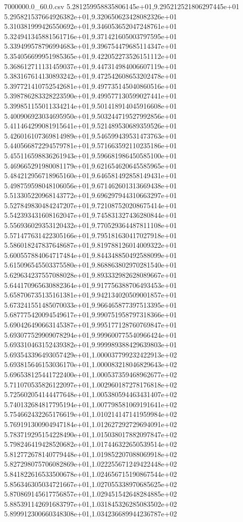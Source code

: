 \begin{filecontents*}{7000000.0_60.0.csv}
5.281259958835806145e+01,9.295212521806297445e+01
5.295821537664926382e+01,9.320650623428082326e+01
5.310381999426550692e+01,9.346053652047248761e+01
5.324941345881561716e+01,9.371421605003797595e+01
5.339499578796994683e+01,9.396754479685114347e+01
5.354056699951985365e+01,9.422052273526151112e+01
5.368612711131459037e+01,9.447314984006607119e+01
5.383167614130893242e+01,9.472542608653202478e+01
5.397721410752542681e+01,9.497735145040860516e+01
5.398786283328223590e+01,9.499577130599027441e+01
5.399851155011334214e+01,9.501418914045916608e+01
5.400906923034695950e+01,9.503244719527992856e+01
5.411464299081915641e+01,9.521489530689359526e+01
5.426016107369814989e+01,9.546599439531473763e+01
5.440566872294579781e+01,9.571663592110235186e+01
5.455116598836261943e+01,9.596681986450585100e+01
5.469665291980081179e+01,9.621654620645585965e+01
5.484212956718965160e+01,9.646581492858149431e+01
5.498759598048106056e+01,9.671462601313669438e+01
5.513305220968143772e+01,9.696297944310663297e+01
5.527849830484247207e+01,9.721087520208675414e+01
5.542393431608162047e+01,9.745831327436280844e+01
5.556936029353120432e+01,9.770529364487811108e+01
5.571477631422305166e+01,9.795181630417027918e+01
5.586018247837648687e+01,9.819788126014009322e+01
5.600557884064717484e+01,9.844348850492588099e+01
5.615096545503375580e+01,9.868863802970281540e+01
5.629634237557088028e+01,9.893332982628089667e+01
5.644170965630882364e+01,9.917756388706493453e+01
5.658706735135161381e+01,9.942134020509001857e+01
5.673241551485070033e+01,9.966465877397513395e+01
5.687775420094549617e+01,9.990751958797318366e+01
5.690426490663145387e+01,9.995177128760769847e+01
5.693077529909078294e+01,9.999600775540966424e+01
5.693310463152439382e+01,9.999989388429639803e+01
5.693543396493057429e+01,1.000037799232422913e+02
5.693815646153036170e+01,1.000083218046829643e+02
5.696538125441722400e+01,1.000537359468962677e+02
5.711070535826122097e+01,1.002960187278176818e+02
5.725602054144477648e+01,1.005380594463431407e+02
5.740132684817795194e+01,1.007798581069191641e+02
5.754662432265176619e+01,1.010214147141959984e+02
5.769191300904947184e+01,1.012627292729694091e+02
5.783719295154228490e+01,1.015038017882097847e+02
5.798246419428520682e+01,1.017446322650539514e+02
5.812772678140779448e+01,1.019852207088069918e+02
5.827298075706082869e+01,1.022255671249422448e+02
5.841822616533500678e+01,1.024656715190867544e+02
5.856346305034721667e+01,1.027055338970685625e+02
5.870869145617756857e+01,1.029451542648284885e+02
5.885391142691683797e+01,1.031845326285083502e+02
5.899912300660348308e+01,1.034236689944236787e+02

\end{filecontents*}
